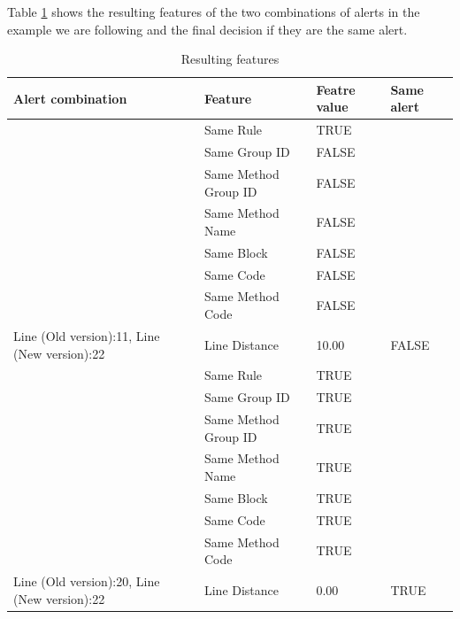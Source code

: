 \documentclass[
]{article}
\begin{document}
Table \ref{table_features_with_decision} shows the resulting features of
the two combinations of alerts in the example we are following and the
final decision if they are the same alert.

\small

\begin{table}[H]

\caption{\label{tab:unnamed-chunk-14}Resulting features\label{table_features_with_decision} }
\centering
\begin{tabular}[t]{l|l|l|l}
\hline
Alert combination & Feature & Featre value & Same alert\\
\hline
\rowcolor{gray!6}  \rowcolor{gray!6}   & Same Rule & TRUE & \\

 & Same Group ID & FALSE & \\

\rowcolor{gray!6}   & Same Method Group ID & FALSE & \\

 & Same Method Name & FALSE & \\

\rowcolor{gray!6}   & Same Block & FALSE & \\

 & Same Code & FALSE & \\

\rowcolor{gray!6}   & Same Method Code & FALSE & \\

\multirow[t]{-8}{*}{\raggedright\arraybackslash Line (Old version):11, Line (New version):22} & Line Distance & 10.00 & \multirow[t]{-8}{*}{\raggedright\arraybackslash FALSE}\\
\cline{1-4}
 & Same Rule & TRUE & \\

 & Same Group ID & TRUE & \\

\rowcolor{gray!6}   & Same Method Group ID & TRUE & \\

 & Same Method Name & TRUE & \\

\rowcolor{gray!6}   & Same Block & TRUE & \\

 & Same Code & TRUE & \\

\rowcolor{gray!6}   & Same Method Code & TRUE & \\

\multirow[t]{-8}{*}{\raggedright\arraybackslash Line (Old version):20, Line (New version):22} & Line Distance & 0.00 & \multirow[t]{-8}{*}{\raggedright\arraybackslash TRUE}\\
\hline
\end{tabular}
\end{table}
\end{document}

